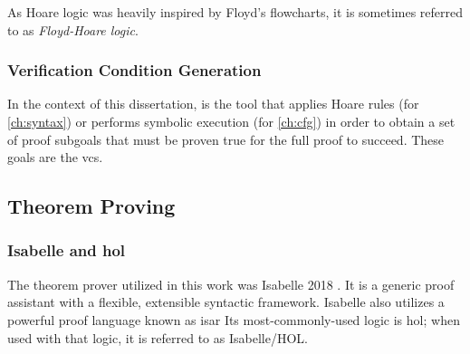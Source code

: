 As Hoare logic was heavily inspired by Floyd's flowcharts, it is sometimes referred to
as \emph{Floyd-Hoare logic}.

\subsubsection{Verification Condition Generation}
In the context of this dissertation,
 is the tool that applies Hoare rules (for \cref{ch:syntax})
or performs symbolic execution (for \cref{ch:cfg})
in order to obtain a set of proof subgoals
that must be proven true for the full proof to succeed.
These goals are the \acp{vc}.


%
%
%

\subsection{Theorem Proving}


\subsubsection{Isabelle and \acs*{hol}}
The theorem prover utilized in this work
was Isabelle 2018 \autocite{nipkow2002isabelle}.%
It is a generic proof assistant with a flexible, extensible syntactic framework.
Isabelle also utilizes a powerful proof language
known as \ac{isar} \autocite{wenzel2007isabelle}
Its most-commonly-used logic is \ac{hol}; when used with that logic,
it is referred to as Isabelle/HOL.

